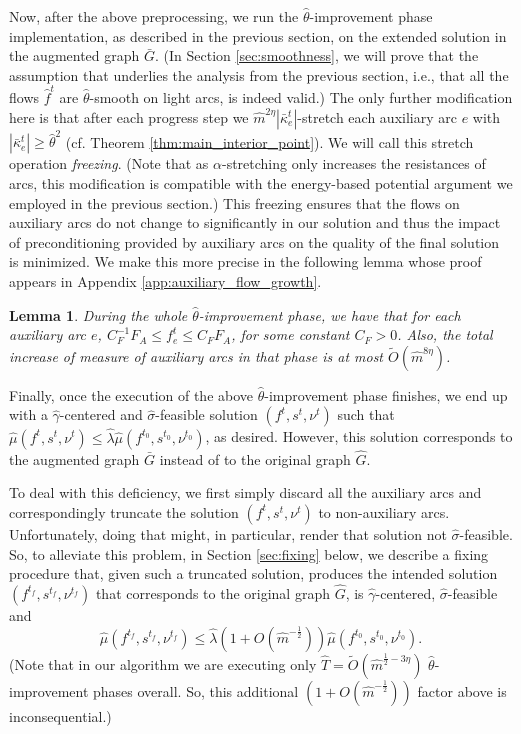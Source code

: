\documentclass[11pt, letterpaper]{article}
\newtheorem{lemma}[theorem]{Lemma}
\newcommand{\cfreeze}{C_{F}}
\newcommand{\fauxiliary}{F_{A}}
\newcommand{\tO}[1]{\widetilde{O}(#1)}
\newcommand{\oG}{\bar{G}}
\newcommand{\hG}{\widehat{G}}
\newcommand{\hm}{\widehat{m}}
\newcommand{\hT}{\widehat{T}}
\newcommand{\hmu}{\hat{\mu}}
\newcommand{\hgamma}{\hat{\gamma}}
\newcommand{\htheta}{\hat{\theta}}
\newcommand{\okappa}{\bar{\kappa}}
\newcommand{\hlambda}{\hat{\lambda}}
\newcommand{\vnu}{\boldsymbol{\mathit{\nu}}}
\newcommand{\hvsigma}{\boldsymbol{\mathit{\hat{\sigma}}}}
\newcommand{\ff}{\boldsymbol{\mathit{f}}}
\newcommand{\hff}{\boldsymbol{\mathit{\hat{f}}}}
\renewcommand{\ss}{\boldsymbol{\mathit{s}}}
\begin{document}
Now, after the above preprocessing, we run the $\htheta$-improvement phase implementation, as described in the previous section, on the extended solution in the augmented graph $\oG$. (In Section \ref{sec:smoothness}, we will prove that the assumption that underlies the analysis from the previous section, i.e., that all the flows $\hff^t$ are $\htheta$-smooth on light arcs, is indeed valid.) The only further modification here is that after each progress step we $\hm^{2\eta}|\okappa_e^t|$-stretch each auxiliary arc $e$ with $|\okappa_e^t|\geq \htheta^{2}$ (cf. Theorem \ref{thm:main_interior_point}). We will call this stretch operation {\em freezing}. (Note that as $\alpha$-stretching only increases the resistances of arcs, this modification is compatible with the energy-based potential argument we employed in the previous section.) This freezing ensures that the flows on auxiliary arcs do not change to significantly in our solution and thus the impact of preconditioning provided by auxiliary arcs on the quality of the final solution is minimized. We make this more precise in the following lemma whose proof appears in Appendix \ref{app:auxiliary_flow_growth}.

\begin{lemma}
\label{lem:auxiliary_flow_growth}
During the whole $\htheta$-improvement phase, we have that for each auxiliary arc $e$, $\cfreeze^{-1} \fauxiliary\leq f_e^t \leq \cfreeze \fauxiliary$, for some constant $\cfreeze>0$. Also, the total increase of measure of auxiliary arcs in that phase is at most $\tO{\hm^{8\eta}}$.
\end{lemma}



Finally, once the execution of the above $\htheta$-improvement phase finishes, we end up with a $\hgamma$-centered and $\hvsigma$-feasible solution $(\ff^{t},\ss^{t},\vnu^{t})$ such that $\hmu(\ff^{t},\ss^{t},\vnu^{t})\leq \hlambda \hmu(\ff^{t_0},\ss^{t_0},\vnu^{t_0})$, as desired. However, this solution corresponds to the augmented graph $\oG$ instead of to the original graph $\hG$. 

To deal with this deficiency, we first simply discard all the auxiliary arcs and correspondingly truncate the solution $(\ff^{t},\ss^{t},\vnu^{t})$ to non-auxiliary arcs. Unfortunately, doing that might, in particular, render that solution not $\hvsigma$-feasible. So, to alleviate this problem, in Section \ref{sec:fixing} below, we describe a fixing procedure that, given such a truncated solution, produces the intended solution $(\ff^{t_f},\ss^{t_f},\vnu^{t_f})$ that corresponds to the original graph $\hG$, is $\hgamma$-centered, $\hvsigma$-feasible and
\[
\hmu(\ff^{t_f},\ss^{t_f},\vnu^{t_f})\leq \hlambda (1+O(\hm^{-\frac{1}{2}}))\hmu(\ff^{t_0},\ss^{t_0},\vnu^{t_0}).
\]
(Note that in our algorithm we are executing only $\hT=\tO{\hm^{\frac{1}{2}-3\eta}}$ $\htheta$-improvement phases overall. So, this additional $(1+O(\hm^{-\frac{1}{2}}))$ factor above is inconsequential.) 
\end{document}
